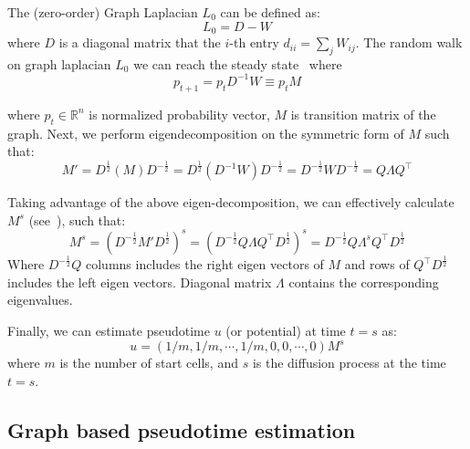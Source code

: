 \noindent The (zero-order) Graph Laplacian $L_0$ can be defined as:
\begin{equation}
\label{eqn:L0}
L_0 = D - W
\end{equation}
\noindent where $D$ is a diagonal matrix that the $i$-th entry $d_{ii} = \sum_j W_{ij}$.  The random walk on graph laplacian $L_0$ we can reach the steady state~\citep{delvenne2010stability} where
\begin{equation}
\label{eqn:transitionmatrix}
p_{t+1} = p_t D^{-1}W \equiv p_t M
\end{equation}

\noindent where $p_t\in \mathbb{R}^n$ is normalized probability vector, $M$ is transition matrix of the graph. Next, we perform eigendecomposition on the symmetric form of $M$ such that:
\begin{equation}
\label{eqn:l0symeigendecomposition}
M' = D^{\frac{1}{2}}(M) D^{-\frac{1}{2}} = D^{\frac{1}{2}}(D^{-1}W) D^{-\frac{1}{2}} = D^{-\frac{1}{2}}WD^{-\frac{1}{2}} = Q\Lambda Q^\top
\end{equation}

\noindent Taking advantage of the above eigen-decomposition, we can effectively calculate $M^s$ (see~\cite{coifman2005geometric}), such that:
\begin{equation}
\label{eqn:l0eigendecomposition}
    M^s = (D^{-\frac{1}{2}} M' D^{\frac{1}{2}})^s =  (D^{-\frac{1}{2}} Q\Lambda Q^\top D^{\frac{1}{2}})^s =  D^{-\frac{1}{2}} Q \Lambda^s Q^\top D^{\frac{1}{2}}
\end{equation}
Where $D^{-\frac{1}{2}}Q$ columns includes the right eigen vectors of $M$ and rows of $Q^\top D^{\frac{1}{2}}$ includes the left eigen vectors. Diagonal matrix $\Lambda$ contains the corresponding eigenvalues.

Finally, we can estimate pseudotime $u$ (or potential) at time $t=s$ as:
\begin{equation}
\label{eqn:potential}
u = (1/m, 1/m,\cdots, 1/m, 0,0,\cdots,0)M^{s}
\end{equation}
\noindent where $m$ is the number of start cells, and $s$ is the diffusion process at the time $t=s$.


\subsection{Graph based pseudotime estimation}

